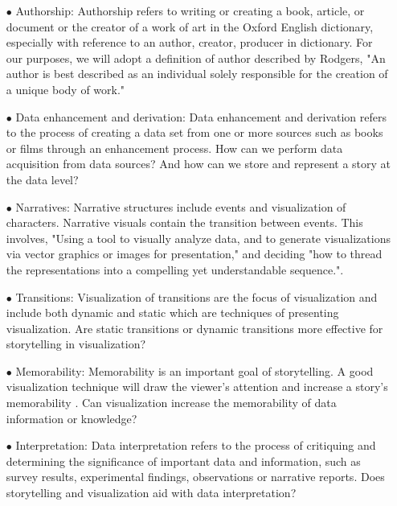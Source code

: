 \documentclass{egpubl}
\begin{document}
\begin{enumerate}
	\item[$\bullet$] Authorship: Authorship refers to writing or creating a book, article, or document or the creator of a work of art in the Oxford English dictionary\cite{authoship2}, especially with reference to an author, creator, producer in dictionary\cite{authoship1}. For our purposes, we will adopt a definition of author described by Rodgers\cite{rodgers2011}, "An author is best described as an individual solely responsible for the creation of a unique body of work."
	\item[$\bullet$] Data enhancement and derivation: Data enhancement and derivation refers to the process of creating a data set from one or more sources such as books or films through an enhancement process. How can we perform data acquisition from data sources? And how can we store and represent a story at the data level?
	\item[$\bullet$] Narratives: Narrative structures include events and visualization of characters. Narrative visuals contain the transition between events. This involves, "Using a tool to visually analyze data, and to generate visualizations via vector graphics or images for presentation," and deciding "how to thread the representations into a compelling yet understandable sequence."\cite{hullman2013deeper}.
	
	\item[$\bullet$] Transitions: Visualization of transitions are the focus of visualization and include both dynamic and static which are techniques of presenting visualization. Are static transitions or dynamic transitions more effective for storytelling in visualization?
	
	\item[$\bullet$]Memorability: Memorability is an important goal of storytelling. A good visualization technique will draw the viewer's attention and increase a story's memorability \cite{bateman}. Can visualization increase the memorability of data information or knowledge?
	
	\item[$\bullet$] Interpretation: Data interpretation refers to the process of critiquing and determining the significance of important data and information, such as survey results, experimental findings, observations or narrative reports. Does storytelling and visualization aid with data interpretation? 
	
\end{enumerate}
\end{document}
